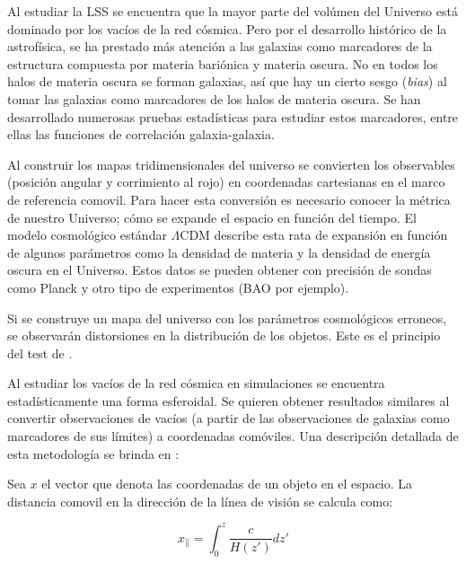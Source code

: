 \documentclass[preprint]{aastex62}
\begin{document}


  Al estudiar la LSS se encuentra que la mayor parte del volúmen del Universo está dominado
  por los vacíos de la red cósmica. Pero por el desarrollo histórico de la astrofísica, se ha
  prestado más atención a las galaxias como marcadores de la estructura compuesta por materia
  bariónica y materia oscura. No en todos los halos de materia oscura se forman galaxias, así
  que hay un cierto sesgo (\textit{bias}) al tomar las galaxias como marcadores de los
  halos de materia oscura. Se han desarrollado numerosas pruebas estadísticas para estudiar
  estos marcadores, entre ellas las funciones de correlación galaxia-galaxia.

  Al construir los mapas tridimensionales del universo se convierten los observables (posición
  angular y corrimiento al rojo) en coordenadas cartesianas en el marco de referencia comovil.
  Para hacer esta conversión es necesario conocer la métrica de nuestro Universo; cómo se
  expande el espacio en función del tiempo. El modelo cosmológico estándar $\Lambda$CDM
  describe esta rata de expansión en función de algunos parámetros como la densidad de materia
  y la densidad de energía oscura en el Universo. Estos datos se pueden obtener con precisión
  de sondas como Planck y otro tipo de experimentos (BAO por ejemplo).

  Si se construye un mapa del universo con los parámetros cosmológicos erroneos, se observarán
  distorsiones en la distribución de los objetos. Este es el principio del test de
  \citet{AlcockPaczynski1979}.

  Al estudiar los vacíos de la red cósmica en simulaciones se encuentra estadísticamente una
  forma esferoidal. Se quieren obtener resultados similares al convertir observaciones de
  vacíos (a partir de las observaciones de galaxias como marcadores de sus límites) a coordenadas
  comóviles. Una descripción detallada de esta metodología se brinda en \citet{Hamaus2015}:

  Sea $x$ el vector que denota las coordenadas de un objeto en el espacio. La distancia comovil en la
  dirección de la línea de visión se calcula como:

  \begin{equation}
    x_{\parallel} = \int _0 ^z \frac{c}{H(z')}dz'
  \end{equation}
\end{document}

